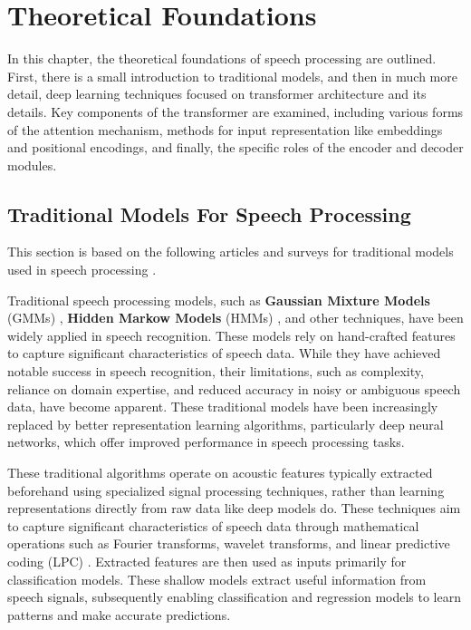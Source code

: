 \chapter{Theoretical Foundations}\label{chap_theory}
In this chapter, the theoretical foundations of speech processing are outlined. First, there is a small introduction to traditional models, and then in much more detail, deep learning techniques focused on transformer architecture and its details. Key components of the transformer are examined, including various forms of the attention mechanism, methods for input representation like embeddings and positional encodings, and finally, the specific roles of the encoder and decoder modules.

\section{Traditional Models For Speech Processing}
This section is based on the following articles and surveys for traditional models used in speech processing  \cite{Mehrish_2023, Prabhavalkar_2024, Basak2022}. 

Traditional speech processing models, such as \textbf{Gaussian Mixture Models} (GMMs) \cite{inbook_gmm}, \textbf{Hidden Markow Models} (HMMs) \cite{8187420}, and other techniques, have been widely applied in speech recognition. These models rely on hand-crafted features to capture significant characteristics of speech data. While they have achieved notable success in speech recognition, their limitations, such as complexity, reliance on domain expertise, and reduced accuracy in noisy or ambiguous speech data, have become apparent. These traditional models have been increasingly replaced by better representation learning algorithms, particularly deep neural networks, which offer improved performance in speech processing tasks.

These traditional algorithms operate on acoustic features typically extracted beforehand using specialized signal processing techniques, rather than learning representations directly from raw data like deep models do. These techniques aim to capture significant characteristics of speech data through mathematical operations such as Fourier transforms, wavelet transforms, and linear predictive coding (LPC) \cite{o1988linear}. Extracted features are then used as inputs primarily for classification models. These shallow models extract useful information from speech signals, subsequently enabling classification and regression models to learn patterns and make accurate predictions.

